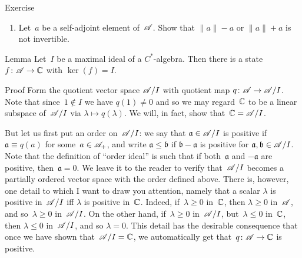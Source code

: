 \documentclass[a]{subfiles}
\begin{document}
\begin{parsec}
\begin{point}{Exercise}
\begin{enumerate}
\item
Let~$a$ be a self-adjoint element of~$\mathscr{A}$.
Show that  $\|a\|-a$
or $\|a\|+a$ is not invertible.
\end{enumerate}
\end{point}
\begin{point}{Lemma}%
Let~$I$ be a maximal ideal of a $C^*$-algebra.
Then there is a state $f\colon \mathscr{A}\to \mathbb{C}$
with $\ker(f)=I$.
\begin{point}{Proof}%
Form the quotient vector space $\mathscr{A}/I$
with quotient map $q\colon \mathscr{A}\to \mathscr{A}/I$.
Note that since~$1\notin I$
we have $q(1)\neq 0$
and so we may regard~$\mathbb{C}$ 
to be a linear subspace of~$\mathscr{A}/I$
via $\lambda\mapsto q(\lambda)$.
We will, in fact, show that~$\mathbb{C}=\mathscr{A}/I$.

But let us first put an order on~$\mathscr{A}/I$:
we say that $\mathfrak{a}\in \mathscr{A}/I$ is positive
if $\mathfrak{a}\equiv q(a)$ for some~$a\in\mathscr{A}_{+}$,
and write $\mathfrak{a}\leq \mathfrak{b}$ 
if $\mathfrak{b}-\mathfrak{a}$ is positive
for $\mathfrak{a},\mathfrak{b}\in\mathscr{A}/I$.
Note that the definition of ``order ideal'' is such
that if both~$\mathfrak{a}$ and $-\mathfrak{a}$ are positive,
then~$\mathfrak{a}=0$.
We leave it to the reader to verify 
that~$\mathscr{A}/I$ becomes a partially ordered vector space
with the order defined above.
There is, however,
one detail to which I want to draw you attention,
namely that a scalar $\lambda$ is positive in~$\mathscr{A}/I$
iff $\lambda$ is positive in~$\mathbb{C}$.
Indeed, if~$\lambda\geq 0$ in~$\mathbb{C}$,
then $\lambda\geq 0$ in~$\mathscr{A}$, and so~$\lambda \geq 0$ in~$\mathscr{A}/I$.
On the other hand,
if~$\lambda\geq 0$ in~$\mathscr{A}/I$, but~$\lambda\leq 0$ in~$\mathbb{C}$,
then $\lambda\leq 0$ in~$\mathscr{A}/I$,
and so $\lambda=0$.
This detail
has the desirable consequence
that once we have shown that~$\mathscr{A}/I=\mathbb{C}$,
we automatically get that~$q\colon \mathscr{A}\to\mathbb{C}$ is positive.


\end{point}
\end{point}
\end{parsec}
\end{document}
